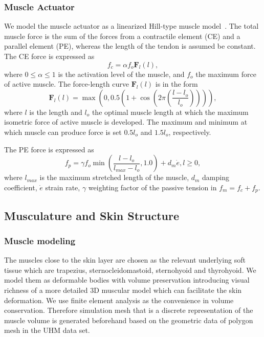 \subsubsection{\textbf{Muscle Actuator}}
\label{sec:muscleactuationmodel}
We model the muscle actuator as a linearized Hill-type muscle model~\cite{Lee:2006:HUB}. The total muscle force is the sum of the forces from a contractile element (CE) and a parallel element (PE), whereas the length of the tendon is assumed be constant. The CE force is expressed as
\begin{equation}
f_{c}=\alpha f_{o}\mathbf{F}_{l}(l),
\end{equation}
where $0\leq\alpha\leq1$ is the activation level of the muscle, and $f_{o}$ the
maximum force of active muscle. The force-length curve $\mathbf{F}_{l}(l)$ is in the form
\begin{equation}
\mathbf{F}_{l}(l)=\max(0, 0.5(1+\cos(2\pi(\frac{l-l_{o}}{l_{o}})))),
\end{equation}
where $l$ is the length and $l_{o}$ the optimal muscle length at which the maximum isometric force of active muscle is developed. The maximum and minimum at which muscle can produce force is set $0.5l_{o}$ and $1.5l_{o}$, respectively.

The PE force is expressed as
\begin{equation}
f_{p}=\gamma f_{o}\min(\frac{l-l_{o}}{l_{max}-l_{o}},1.0)+d_{m}\dot{e}, l\geq0,
\end{equation}
where $l_{max}$ is the maximum stretched length of the muscle, $d_{m}$ damping coefficient, $\dot{e}$ strain rate, $\gamma$ weighting factor of the passive tension in $f_{m}=f_{c}+f_{p}$.

\subsection{Musculature and Skin Structure}
\label{sec:tissuemodel}
\subsubsection{\textbf{Muscle modeling}}
\label{sec:musclemodeling}
The muscles close to the skin layer are chosen as the relevant underlying soft tissue which are trapezius, sternocleidomastoid, sternohyoid and thyrohyoid. We model them as deformable bodies with volume preservation introducing visual richness of a more detailed 3D muscular model which can facilitate the skin deformation. We use finite element analysis as the convenience in volume conservation. Therefore simulation mesh that is a discrete representation of the muscle volume is generated beforehand based on the geometric data of polygon mesh in the UHM data set.

